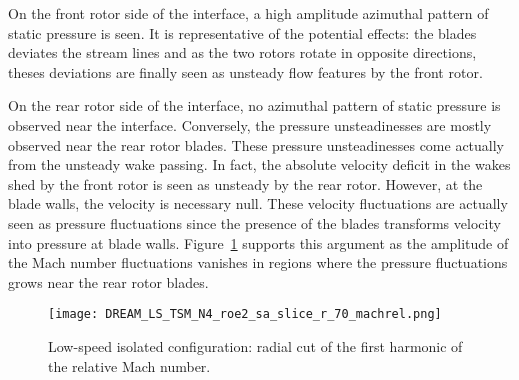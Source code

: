 On the front rotor side of the interface, a high amplitude azimuthal 
pattern of static pressure is seen. It is representative
of the potential effects: the blades deviates the stream lines and
as the two rotors rotate in opposite directions, theses deviations
are finally seen as unsteady flow features by the front rotor.

On the rear rotor side of the interface, no azimuthal pattern 
of static pressure is observed near the interface.
Conversely, the pressure unsteadinesses are mostly observed near the rear rotor blades.
These pressure unsteadinesses come actually from the unsteady wake passing.
In fact, the absolute velocity deficit in the wakes shed by the front rotor
is seen as unsteady by the rear rotor. However, at the blade walls,
the velocity is necessary null. These 
velocity fluctuations are actually seen as pressure fluctuations since the presence
of the blades transforms velocity into pressure at blade walls.
Figure~\ref{fig:dream_ls_hb_radial_cuts_machrel}
supports this argument as the amplitude of the Mach number fluctuations
vanishes in regions where the pressure fluctuations grows near the
rear rotor blades.
\begin{figure}[htp]
  \centering
  \texttt{[image: DREAM\_LS\_TSM\_N4\_roe2\_sa\_slice\_r\_70\_machrel.png]}
  \caption{Low-speed isolated configuration: radial cut of the first harmonic of the
  relative Mach number.}
  \label{fig:dream_ls_hb_radial_cuts_machrel}
\end{figure}

